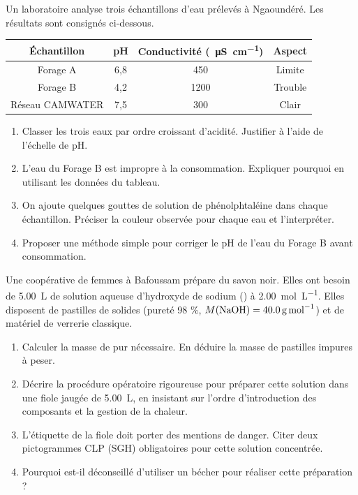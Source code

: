 \documentclass[11pt]{article}
\begin{document}
\begin{exercice}
Un laboratoire analyse trois échantillons d'eau prélevés à Ngaoundéré. Les résultats sont consignés ci-dessous.

\begin{tabular}{|c|c|c|c|}
\hline
\textbf{Échantillon} & \textbf{pH} & \textbf{Conductivité (\SI{}{\micro S.cm^{-1}})} & \textbf{Aspect} \\ \hline
Forage A & 6,8 & 450 & Limite \\ \hline
Forage B & 4,2 & 1200 & Trouble \\ \hline
Réseau CAMWATER & 7,5 & 300 & Clair \\ \hline
\end{tabular}

\begin{enumerate}
    \item Classer les trois eaux par ordre croissant d'acidité. Justifier à l'aide de l'échelle de pH.
    \item L'eau du Forage B est impropre à la consommation. Expliquer pourquoi en utilisant les données du tableau.
    \item On ajoute quelques gouttes de solution de phénolphtaléine dans chaque échantillon. Préciser la couleur observée pour chaque eau et l'interpréter.
    \item Proposer une méthode simple pour corriger le pH de l'eau du Forage B avant consommation.
\end{enumerate}
\end{exercice}

\begin{exercice}
Une coopérative de femmes à Bafoussam prépare du savon noir. Elles ont besoin de \SI{5,00}{L} de solution aqueuse d'hydroxyde de sodium () à \SI{2,00}{mol.L^{-1}}. Elles disposent de pastilles de  solides (pureté 98 \%, $M(\ce{NaOH}) = \SI{40,0}{g.mol^{-1}}$) et de matériel de verrerie classique.
\begin{enumerate}
    \item Calculer la masse de  pur nécessaire. En déduire la masse de pastilles impures à peser.
    \item Décrire la procédure opératoire rigoureuse pour préparer cette solution dans une fiole jaugée de \SI{5,00}{L}, en insistant sur l'ordre d'introduction des composants et la gestion de la chaleur.
    \item L'étiquette de la fiole doit porter des mentions de danger. Citer deux pictogrammes CLP (SGH) obligatoires pour cette solution concentrée.
    \item Pourquoi est-il déconseillé d'utiliser un bécher pour réaliser cette préparation ?
\end{enumerate}
\end{exercice}
\end{document}
